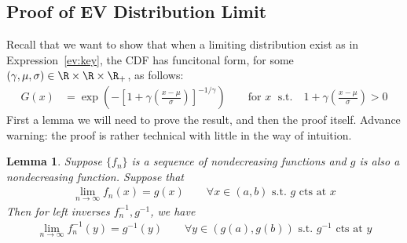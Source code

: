 \documentclass[12pt]{article}
\theoremstyle{plain}
\newtheorem{lem}[thm]{Lemma}
\theoremstyle{definition}
\theoremstyle{remark}
\newcommand{\limn}{\lim_{n\rightarrow\infty}}
\begin{document}
\clearpage
\subsection{Proof of EV Distribution Limit}

Recall that we want to show that when a limiting distribution exist as
in Expression~\ref{ev:key}, the CDF has funcitonal form, for some
$(\gamma,\mu,\sigma)\in \R\times \R \times \R_+$, as follows:
\begin{align*}
  G(x)
  &=
  \exp\left(
  -\left[1+\gamma \left(\frac{x-\mu}{\sigma}\right)\right]^{-1/\gamma}
  \right)
  \qquad\text{for $x\;$ s.t.}\quad
  1+\gamma \left(\frac{x-\mu}{\sigma}\right)>0
\end{align*}
First a lemma we will need to prove the result, and then the proof
itself. Advance warning: the proof is rather technical with little in
the way of intuition.


\begin{lem}
Suppose $\{f_n\}$ is a sequence of nondecreasing functions and $g$ is
also a nondecreasing function.
Suppose that
\begin{align*}
  \limn f_n(x) = g(x)
  \qquad
  \text{$\forall x\in(a,b)$ s.t. $g$ cts at $x$}
\end{align*}
Then for left inverses $f^{-1}_n,g^{-1}$, we have
\begin{align*}
  \limn f^{-1}_n(y) = g^{-1}(y)
  \qquad
  \text{$\forall y\in(g(a),g(b))$ s.t. $g^{-1}$ cts at $y$}
\end{align*}
\end{lem}
\end{document}
